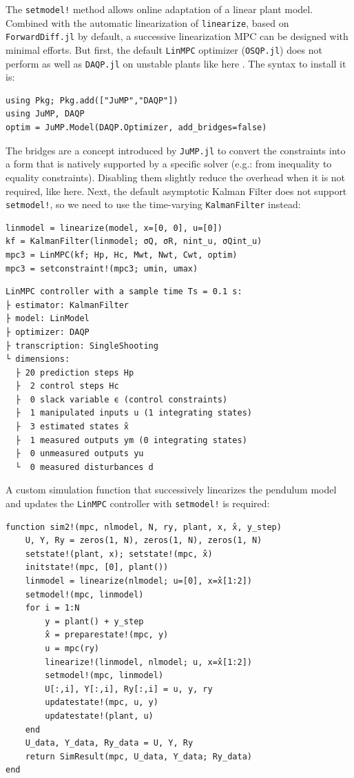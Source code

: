The \texttt{setmodel!} method allows online adaptation of a linear plant model. Combined with the automatic linearization of \texttt{linearize}, based on \texttt{ForwardDiff.jl} by default, a successive linearization MPC can be designed with minimal efforts. But first, the default \texttt{LinMPC} optimizer (\texttt{OSQP.jl}) does not perform as well as \texttt{DAQP.jl} on unstable plants like here \citep{daqp}. The syntax to install it is: 
\begin{verbatim}
using Pkg; Pkg.add(["JuMP","DAQP"])
using JuMP, DAQP
optim = JuMP.Model(DAQP.Optimizer, add_bridges=false)
\end{verbatim}
The bridges are a concept introduced by \texttt{JuMP.jl} to convert the constraints into a form that is natively supported by a specific solver (e.g.: from inequality to equality constraints). Disabling them slightly reduce the overhead when it is not required, like here. Next, the default asymptotic Kalman Filter does not support \texttt{setmodel!}, so we need to use the time-varying \texttt{KalmanFilter} instead:
\begin{verbatim}
linmodel = linearize(model, x=[0, 0], u=[0])
kf = KalmanFilter(linmodel; σQ, σR, nint_u, σQint_u)
mpc3 = LinMPC(kf; Hp, Hc, Mwt, Nwt, Cwt, optim)
mpc3 = setconstraint!(mpc3; umin, umax)
\end{verbatim}
\spacerepl
\begin{verbatim}
LinMPC controller with a sample time Ts = 0.1 s:
├ estimator: KalmanFilter
├ model: LinModel
├ optimizer: DAQP 
├ transcription: SingleShooting
└ dimensions:
  ├ 20 prediction steps Hp
  ├  2 control steps Hc
  ├  0 slack variable ϵ (control constraints)
  ├  1 manipulated inputs u (1 integrating states)
  ├  3 estimated states x̂
  ├  1 measured outputs ym (0 integrating states)
  ├  0 unmeasured outputs yu
  └  0 measured disturbances d
\end{verbatim}
A custom simulation function that successively linearizes the pendulum model and updates the \texttt{LinMPC} controller with \texttt{setmodel!} is required: 
\begin{verbatim}
function sim2!(mpc, nlmodel, N, ry, plant, x, x̂, y_step)
    U, Y, Ry = zeros(1, N), zeros(1, N), zeros(1, N)
    setstate!(plant, x); setstate!(mpc, x̂)
    initstate!(mpc, [0], plant())
    linmodel = linearize(nlmodel; u=[0], x=x̂[1:2])
    setmodel!(mpc, linmodel)
    for i = 1:N
        y = plant() + y_step
        x̂ = preparestate!(mpc, y)
        u = mpc(ry)
        linearize!(linmodel, nlmodel; u, x=x̂[1:2])
        setmodel!(mpc, linmodel) 
        U[:,i], Y[:,i], Ry[:,i] = u, y, ry
        updatestate!(mpc, u, y)
        updatestate!(plant, u)
    end
    U_data, Y_data, Ry_data = U, Y, Ry
    return SimResult(mpc, U_data, Y_data; Ry_data)
end
\end{verbatim}
